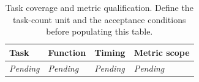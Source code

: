 \begin{table}[t]
\centering
\caption{Task coverage and metric qualification. Define the task-count unit and the acceptance conditions before populating this table.}
\label{tab:coverage}
\begin{tabular}{llll}
\toprule
Task & Function & Timing & Metric scope \\
\midrule
\emph{Pending} & \emph{Pending} & \emph{Pending} & \emph{Pending} \\
\bottomrule
\end{tabular}
\end{table}
